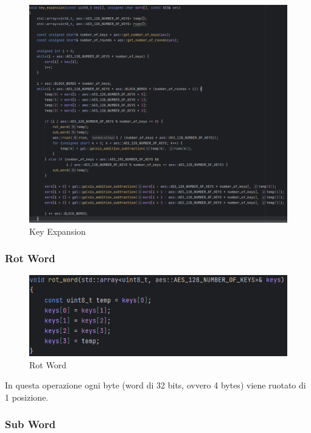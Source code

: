 \begin{figure}[H]
	\centering
	\includegraphics[width=1\textwidth, height=1\textheight, keepaspectratio]{./images/code/cpp/key_expansion/key_expansion.PNG}
	\caption{Key Expansion}
	\label{fig:key_expansion_code}
\end{figure}

\subsubsection{Rot Word}

\begin{figure}[H]
	\centering
	\includegraphics[width=1\textwidth, height=1\textheight, keepaspectratio]{./images/code/cpp/key_expansion/rot_word.PNG}
	\caption{Rot Word}
	\label{fig:rot_word}
\end{figure}

\textsf{\small In questa operazione ogni byte (word di 32 bits, ovvero 4 bytes) viene ruotato di 1 posizione.} %

\subsubsection{Sub Word}

